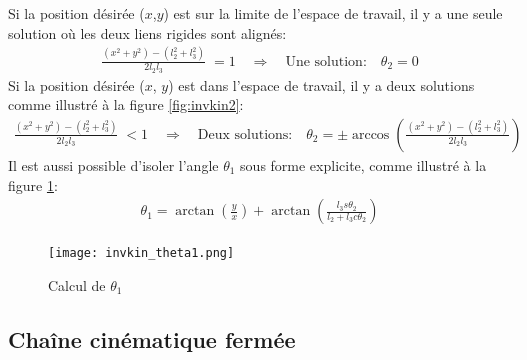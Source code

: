 Si la position désirée ($x$,$y$) est sur la limite de l'espace de travail, il y a une seule solution où les deux liens rigides sont alignés:
\begin{align}
	\frac{ (x^2 + y^2) - (l_2^2 + l_3^2) }{2 l_2 l_3} \; = 1 \quad\Rightarrow\quad \text{Une solution:} \quad  \theta_2 = 0
\end{align}
Si la position désirée ($x$, $y$) est dans l'espace de travail, il y a deux solutions comme illustré à la figure \ref{fig:invkin2}:
\begin{align}
	\frac{ (x^2 + y^2) - (l_2^2 + l_3^2) }{2 l_2 l_3} \; < 1 \quad\Rightarrow\quad \text{Deux solutions:} \quad  \theta_2 = \pm \arccos \left(\frac{ (x^2 + y^2) - (l_2^2 + l_3^2) }{2 l_2 l_3}\right)
\end{align}
Il est aussi possible d'isoler l'angle $\theta_1$ sous forme explicite, comme illustré à la figure \ref{fig:invkin_theta1}:
\begin{align}
	\theta_1 = \arctan \left( \frac{y}{x} \right) + \arctan \left( \frac{l_3 s\theta_2}{l_2 + l_3 c\theta_2} \right)
\end{align}

\begin{figure}[htbp]
	\centering
	\texttt{[image: invkin\_theta1.png]}
	\caption{Calcul de $\theta_1$}
	\label{fig:invkin_theta1}
\end{figure}



\newpage
\subsection{Chaîne cinématique fermée}

